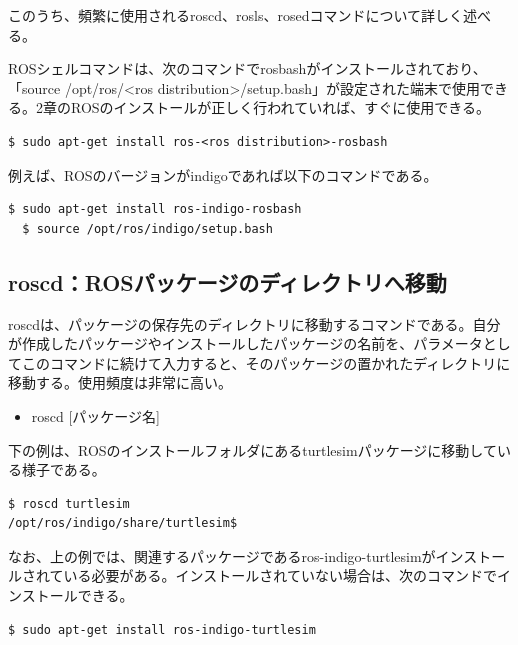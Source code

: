 このうち、頻繁に使用されるroscd、rosls、rosedコマンドについて詳しく述べる。

\begin{exercise}[ROSシェルコマンドを使用できる環境]
    ROSシェルコマンドは、次のコマンドでrosbashがインストールされており、「source /opt/ros/<ros distribution>/setup.bash」が設定された端末で使用できる。2章のROSのインストールが正しく行われていれば、すぐに使用できる。
  \begin{lstlisting}[language=ROS]
  $ sudo apt-get install ros-<ros distribution>-rosbash
  \end{lstlisting}
  例えば、ROSのバージョンがindigoであれば以下のコマンドである。
  \begin{lstlisting}[language=ROS]
  $ sudo apt-get install ros-indigo-rosbash
  $ source /opt/ros/indigo/setup.bash
  \end{lstlisting}
\end{exercise}

\subsection{roscd：ROSパッケージのディレクトリへ移動}

roscdは、パッケージの保存先のディレクトリに移動するコマンドである。自分が作成したパッケージやインストールしたパッケージの名前を、パラメータとしてこのコマンドに続けて入力すると、そのパッケージの置かれたディレクトリに移動する。使用頻度は非常に高い。\\

\begin{itemize}
\item roscd [パッケージ名]\\
\end{itemize}

下の例は、ROSのインストールフォルダにあるturtlesimパッケージに移動している様子である。

\begin{lstlisting}[language=ROS]
$ roscd turtlesim
/opt/ros/indigo/share/turtlesim$
\end{lstlisting}

なお、上の例では、関連するパッケージであるros-indigo-turtlesimがインストールされている必要がある。インストールされていない場合は、次のコマンドでインストールできる。\\

\begin{lstlisting}[language=ROS]
$ sudo apt-get install ros-indigo-turtlesim
\end{lstlisting}

